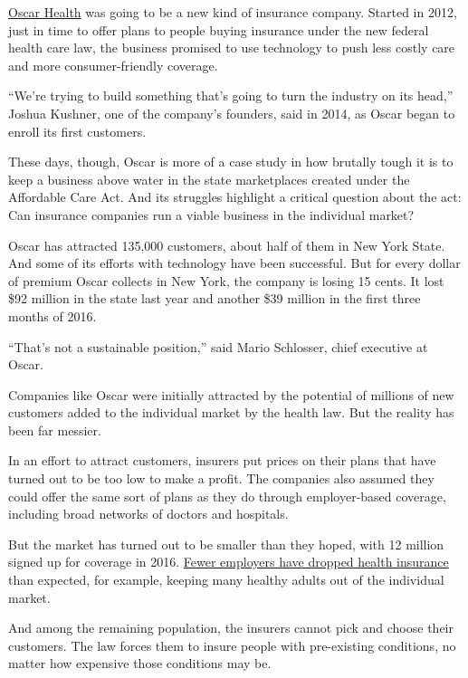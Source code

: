 \href{https://www.hioscar.com/}{Oscar Health} was going to be a new kind
of insurance company. Started in 2012, just in time to offer plans to
people buying insurance under the new federal health care law, the
business promised to use technology to push less costly care and more
consumer-friendly coverage.

``We're trying to build something that's going to turn the industry on
its head,'' Joshua Kushner, one of the company's founders, said in 2014,
as Oscar began to enroll its first customers.

These days, though, Oscar is more of a case study in how brutally tough
it is to keep a business above water in the state marketplaces created
under the Affordable Care Act. And its struggles highlight a critical
question about the act: Can insurance companies run a viable business in
the individual market?

Oscar has attracted 135,000 customers, about half of them in New York
State. And some of its efforts with technology have been successful. But
for every dollar of premium Oscar collects in New York, the company is
losing 15 cents. It lost \$92 million in the state last year and another
\$39 million in the first three months of 2016.

``That's not a sustainable position,'' said Mario Schlosser, chief
executive at Oscar.

Companies like Oscar were initially attracted by the potential of
millions of new customers added to the individual market by the health
law. But the reality has been far messier.

In an effort to attract customers, insurers put prices on their plans
that have turned out to be too low to make a profit. The companies also
assumed they could offer the same sort of plans as they do through
employer-based coverage, including broad networks of doctors and
hospitals.

But the market has turned out to be smaller than they hoped, with 12
million signed up for coverage in 2016.
\href{https://www.nytimes.com/2016/04/05/business/employers-keep-health-insurance-despite-affordable-care-act.html?_r=0}{Fewer
employers have dropped health insurance} than expected, for example,
keeping many healthy adults out of the individual market.

And among the remaining population, the insurers cannot pick and choose
their customers. The law forces them to insure people with pre-existing
conditions, no matter how expensive those conditions may be.

